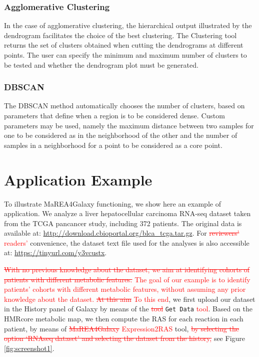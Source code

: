 \documentclass[preprint,12pt,authoryear]{elsarticle}
\newcommand{\red}{\textcolor{red}}
\newcommand{\mareagalaxy}{\textsf{MaREA4Galaxy}}
\newcommand{\clusterTool}{\textsf{Clustering}}
\newcommand{\RASTool}{\textsf{Expression2RAS}}
\begin{document}
\subsubsection{Agglomerative Clustering}

In the case of agglomerative clustering, the hierarchical output
illustrated by the dendrogram facilitates the choice of the best
clustering. The \clusterTool{} tool returns the set of clusters
obtained when cutting the dendrograms at different points.
%
The user can specify the minimum and maximum number of clusters to be
tested and whether the dendrogram plot must be generated.


\subsubsection{DBSCAN}

The DBSCAN method automatically chooses the number of clusters, based
on parameters that define when a region is to be considered
dense. Custom parameters may be used, namely the maximum distance
between two samples for one to be considered as in the neighborhood of
the other and the number of samples in a neighborhood for a point to
be considered as a core point.


\section{Application Example}

To illustrate \mareagalaxy{} functioning, we show here an example of
application.  We analyze a liver hepatocellular carcinoma RNA-seq
dataset taken from the TCGA pancancer study, including 372 patients.
%
The original data is available at:
\url{http://download.cbioportal.org/blca\_tcga.tar.gz}.
%
For \red{\sout{reviewers'} readers'} convenience, the dataset text
file used for the analyses is also accessible at:
\url{https://tinyurl.com/y3vcustx}.

\red{\sout{With no previous knowledge about the dataset, we aim at
    identifying cohorts of patients with different metabolic
    features.}
The goal of our example is to identify patients' cohorts with
different metabolic features, without assuming any prior knowledge
about the dataset.}
%
\red{\sout{At this aim} To this end}, we first upload our dataset in
the History panel of Galaxy by means of the \red{\sout{tool}}
\texttt{Get Data} \red{tool}. Based on the \textsf{HMRcore} metabolic map, we
then compute the RAS for each reaction in each patient, by means of
\red{\sout{\mareagalaxy{}} \RASTool{}} tool, \red{\sout{by selecting the
    option `RNAseq dataset' and selecting the dataset from the
    history,}} see Figure \ref{fig:screenshot1}.
\end{document}
